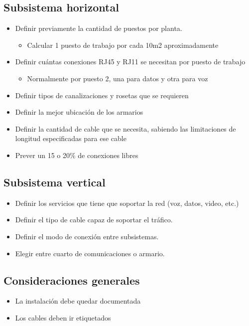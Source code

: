 \documentclass[11pt]{article}
\begin{document}
\subsection{Subsistema horizontal}
\label{sec:org8a4f705}
\begin{itemize}
\item Definir previamente la cantidad de puestos por planta.
\begin{itemize}
\item Calcular 1 puesto de trabajo por cada 10m2 aproximadamente
\end{itemize}
\item Definir cuántas conexiones RJ45 y RJ11 se necesitan por puesto de trabajo
\begin{itemize}
\item Normalmente por puesto 2, una para datos y otra para voz
\end{itemize}
\item Definir tipos de canalizaciones y rosetas que se requieren
\item Definir la mejor ubicación de los armarios
\item Definir la cantidad de cable que se necesita, sabiendo las limitaciones de longitud especificadas para ese cable
\item Prever un 15 o 20\% de conexiones libres
\end{itemize}
\subsection{Subsistema vertical}
\label{sec:org0671738}
\begin{itemize}
\item Definir los servicios que tiene que soportar la red (voz, datos, video, etc.)
\item Definir el tipo de cable capaz de soportar el tráfico.
\item Definir el modo de conexión entre subsistemas.
\item Elegir entre cuarto de comunicaciones o armario.
\end{itemize}
\subsection{Consideraciones generales}
\label{sec:org8b11d3b}
\begin{itemize}
\item La instalación debe quedar documentada
\item Los cables deben ir etiquetados
\end{itemize}
\end{document}

